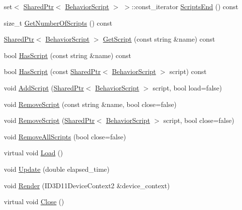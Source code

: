 \begin{DoxyCompactItemize}
\item 
set$<$ \hyperlink{namespacemage_a1e01ae66713838a7a67d30e44c67703e}{Shared\+Ptr}$<$ \hyperlink{classmage_1_1_behavior_script}{Behavior\+Script} $>$ $>$\+::const\+\_\+iterator \hyperlink{classmage_1_1_scene_ab607911e4efd677a08f54101aa8bf2fb}{Scripts\+End} () const
\item 
size\+\_\+t \hyperlink{classmage_1_1_scene_a799ac8ddd90d24f6c3c208942e4f159c}{Get\+Number\+Of\+Scripts} () const
\item 
\hyperlink{namespacemage_a1e01ae66713838a7a67d30e44c67703e}{Shared\+Ptr}$<$ \hyperlink{classmage_1_1_behavior_script}{Behavior\+Script} $>$ \hyperlink{classmage_1_1_scene_aa5d10620d1cf62ba268095f7a2cd2191}{Get\+Script} (const string \&name) const
\item 
bool \hyperlink{classmage_1_1_scene_ad87f96d612fa5087ad3ddcbb73ef05a4}{Has\+Script} (const string \&name) const
\item 
bool \hyperlink{classmage_1_1_scene_a31469e19b181d0cb08bf10c554d28a6d}{Has\+Script} (const \hyperlink{namespacemage_a1e01ae66713838a7a67d30e44c67703e}{Shared\+Ptr}$<$ \hyperlink{classmage_1_1_behavior_script}{Behavior\+Script} $>$ script) const
\item 
void \hyperlink{classmage_1_1_scene_aa98dbf063994948dd2e434c7f0f6ee06}{Add\+Script} (\hyperlink{namespacemage_a1e01ae66713838a7a67d30e44c67703e}{Shared\+Ptr}$<$ \hyperlink{classmage_1_1_behavior_script}{Behavior\+Script} $>$ script, bool load=false)
\item 
void \hyperlink{classmage_1_1_scene_ad240957fb1b30254878cda8e20d7f7f4}{Remove\+Script} (const string \&name, bool close=false)
\item 
void \hyperlink{classmage_1_1_scene_a90808e9356fae9b156a6e23c03950f77}{Remove\+Script} (\hyperlink{namespacemage_a1e01ae66713838a7a67d30e44c67703e}{Shared\+Ptr}$<$ \hyperlink{classmage_1_1_behavior_script}{Behavior\+Script} $>$ script, bool close=false)
\item 
void \hyperlink{classmage_1_1_scene_a283b7623f1f91e5b7ea53c3c938d6026}{Remove\+All\+Scripts} (bool close=false)
\item 
virtual void \hyperlink{classmage_1_1_scene_a472443b059c8be0fcd223f6df8378934}{Load} ()
\item 
void \hyperlink{classmage_1_1_scene_a8751628bf9ed4f15993ca4e8e2ffc966}{Update} (double elapsed\+\_\+time)
\item 
void \hyperlink{classmage_1_1_scene_a39bcf9a202d35558f03112aa2c99090d}{Render} (I\+D3\+D11\+Device\+Context2 \&device\+\_\+context)
\item 
virtual void \hyperlink{classmage_1_1_scene_afcdedaac5ecab7dcbbb180426054aaa5}{Close} ()
\end{DoxyCompactItemize}
